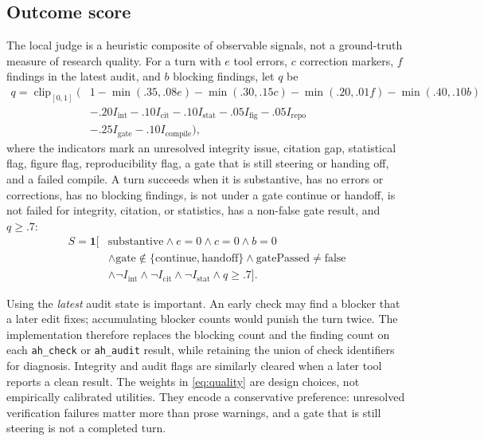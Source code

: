 \subsection{Outcome score}
\label{sec:outcome}
The local judge is a heuristic composite of observable signals, not a ground-truth measure of research quality. For a turn with $e$ tool errors, $c$ correction markers, $f$ findings in the latest audit, and $b$ blocking findings, let $q$ be
\begin{equation}
\label{eq:quality}
\begin{aligned}
q = \operatorname{clip}_{[0,1]}\Big(&1 - \min(.35,.08e) - \min(.30,.15c) - \min(.20,.01f) - \min(.40,.10b) \\
&- .20 I_{\mathrm{int}} - .10 I_{\mathrm{cit}} - .10 I_{\mathrm{stat}} - .05 I_{\mathrm{fig}} - .05 I_{\mathrm{repo}} \\
&- .25 I_{\mathrm{gate}} - .10 I_{\mathrm{compile}}\Big),
\end{aligned}
\end{equation}
where the indicators mark an unresolved integrity issue, citation gap, statistical flag, figure flag, reproducibility flag, a gate that is still steering or handing off, and a failed compile. A turn succeeds when it is substantive, has no errors or corrections, has no blocking findings, is not under a gate continue or handoff, is not failed for integrity, citation, or statistics, has a non-false gate result, and $q\ge .7$:
\begin{equation}
\label{eq:success}
\begin{aligned}
S = \mathbf{1}\big[&\text{substantive} \land e=0 \land c=0 \land b=0 \\
&\land \text{gate}\notin\{\text{continue},\text{handoff}\} \land \text{gatePassed}\neq\text{false} \\
&\land \neg I_{\mathrm{int}} \land \neg I_{\mathrm{cit}} \land \neg I_{\mathrm{stat}} \land q\ge .7\big].
\end{aligned}
\end{equation}

Using the \emph{latest} audit state is important. An early check may find a blocker that a later edit fixes; accumulating blocker counts would punish the turn twice. The implementation therefore replaces the blocking count and the finding count on each \texttt{ah\_check} or \texttt{ah\_audit} result, while retaining the union of check identifiers for diagnosis. Integrity and audit flags are similarly cleared when a later tool reports a clean result. The weights in \cref{eq:quality} are design choices, not empirically calibrated utilities. They encode a conservative preference: unresolved verification failures matter more than prose warnings, and a gate that is still steering is not a completed turn.

